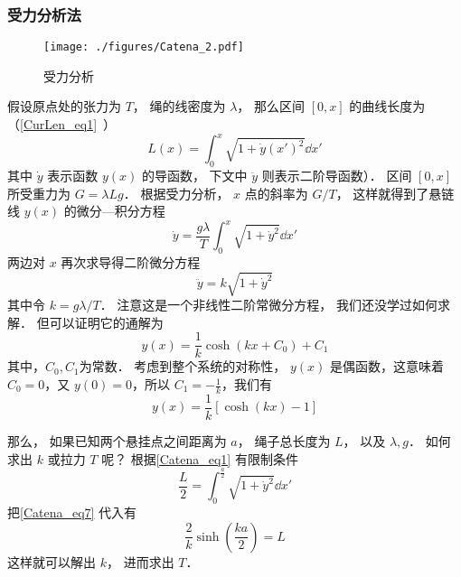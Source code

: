 \subsubsection{受力分析法}
\begin{figure}[ht]
\centering
\texttt{[image: ./figures/Catena\_2.pdf]}
\caption{受力分析} \label{Catena_fig2}
\end{figure}
假设原点处的张力为 $T$， 绳的线密度为 $\lambda$， 那么区间 $[0, x]$ 的曲线长度为（\autoref{CurLen_eq1}~）
\begin{equation}\label{Catena_eq1}
L(x) = \int_0^x \sqrt{1 + \dot y(x')^2} \dd{x'}
\end{equation}
其中 $\dot y$ 表示函数 $y(x)$ 的导函数， 下文中 $\ddot y$ 则表示二阶导函数）． 区间 $[0, x]$ 所受重力为 $G = \lambda L g$． 根据受力分析， $x$ 点的斜率为 $G/T$， 这样就得到了悬链线 $y(x)$ 的微分—积分方程
\begin{equation}
\dot y = \frac{g\lambda}{T} \int_0^x \sqrt{1 + \dot y^2} \dd{x'}
\end{equation}
两边对 $x$ 再次求导得二阶微分方程
\begin{equation}
\ddot y = k \sqrt{1 + \dot y^2}
\end{equation}
其中令 $k = g\lambda/T$． 注意这是一个非线性二阶常微分方程， 我们还没学过如何求解． 但可以证明它的通解为
\begin{equation}\label{Catena_eq2}
y(x) = \frac{1}{k}\cosh(kx+C_0)+C_1
\end{equation}
其中，$C_0,C_1$为常数．
考虑到整个系统的对称性， $y(x)$ 是偶函数，这意味着 $C_0=0$，又 $y(0)=0$，所以 $C_1=-\frac{1}{k}$，我们有
\begin{equation}\label{Catena_eq7}
y(x)=\frac{1}{k}[\cosh(kx)-1]
\end{equation}

那么， 如果已知两个悬挂点之间距离为 $a$， 绳子总长度为 $L$， 以及 $\lambda, g$． 如何求出 $k$ 或拉力 $T$ 呢？ 根据\autoref{Catena_eq1} 有限制条件
\begin{equation}
\frac{L}{2} = \int_{0}^{\frac{a}{2}} \sqrt{1 + \dot y^2} \dd{x'}
\end{equation}
把\autoref{Catena_eq7} 代入有
\begin{equation}
\frac{2}{k}\sinh(\frac{ka}{2}) = L
\end{equation}
这样就可以解出 $k$， 进而求出 $T$．

